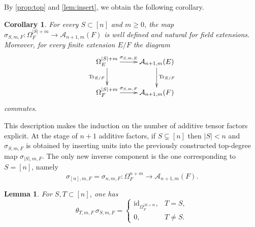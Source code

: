 \documentclass[a4paper,12pt,reqno]{amsart}
\numberwithin{equation}{section}
\newtheorem{cor}[cor]{Corollary}
\newtheorem{lem}[lem]{Lemma}
\theoremstyle{definition}
\DeclareMathOperator{\Tr}{Tr}
\newcommand{\Id}{\mathrm{id}}
\newcommand{\black}{\color{black}}
\newcommand{\Acal}{\mathcal{A}}
\begin{document}
By \autoref{prop:top} and \autoref{lem:insert}, we obtain the following corollary.
\begin{cor}\label{cor:sigtr}
For every $S\subset[n]$ and $m\geq 0$, the map 
$\sigma_{S,m,F}\colon\Omega_F^{|S|+m}\to\Acal_{n+1,m}(F)$ is well defined and
natural for field extensions. 
Moreover, for every finite extension $E/F$ the diagram
\[
\xymatrix{
 \Omega_E^{|S|+m}\ar[r]^-{\sigma_{S,m,E}}\ar[d]_{\Tr_{E/F}}
 &\Acal_{n+1,m}(E)\ar[d]^{\Tr_{E/F}}\\
 \Omega_F^{|S|+m}\ar[r]^-{\sigma_{S,m,F}}
 &\Acal_{n+1,m}(F)
}
\]
commutes.
\end{cor}
\black 


This description makes the induction on the number of additive tensor factors
explicit. 
At the stage of $n+1$ additive factors, if $S\subsetneq[n]$ then
$|S|<n$ and $\sigma_{S,m,F}$ is obtained by inserting units into the
previously constructed top-degree map $\sigma_{|S|,m,F}$.  The only new inverse
component is the one corresponding to $S=[n]$, namely 
\[
 \sigma_{[n],m,F}=\sigma_{n,m,F}:\Omega_F^{n+m}\to\Acal_{n+1,m}(F).
\]

\begin{lem}\label{lem:orth}
For $S,T\subset[n]$, one has
\begin{equation}\label{eq:orth}
 \theta_{T,m,F}\,\sigma_{S,m,F}=
 \begin{cases}
 \Id_{\Omega_F^{|S|+m}},&T=S,\\
 0,&T\neq S.
 \end{cases}
\end{equation}
\end{lem}
\end{document}
